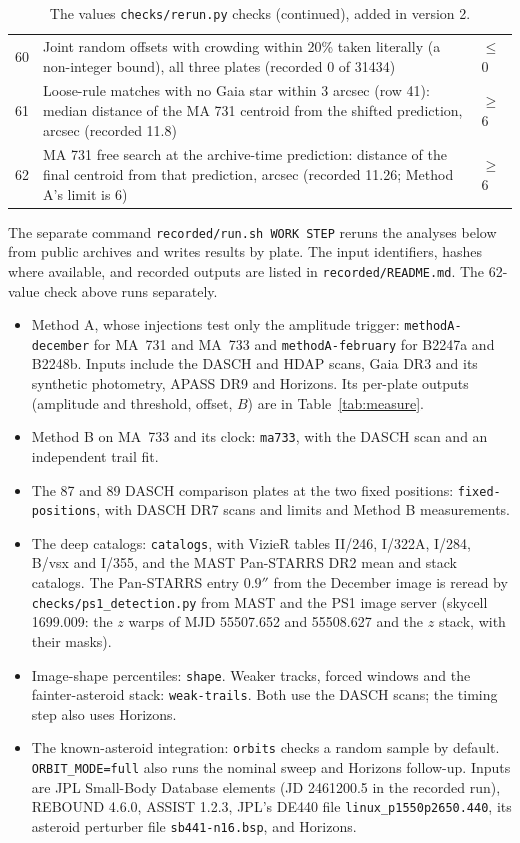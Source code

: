 \documentclass[11pt]{article}
\begin{document}
\begin{appendices}
\begin{table}[ht]
\begin{tabular}{@{}rp{}l@{}}
60 & Joint random offsets with crowding within 20\% taken literally (a non-integer bound), all three plates (recorded 0 of 31434) & $\le$ 0 \\
61 & Loose-rule matches with no Gaia star within 3 arcsec (row 41): median distance of the MA 731 centroid from the shifted prediction, arcsec (recorded 11.8) & $\ge$ 6 \\
62 & MA 731 free search at the archive-time prediction: distance of the final centroid from that prediction, arcsec (recorded 11.26; Method A's limit is 6) & $\ge$ 6 \\
\bottomrule
\end{tabular}
\caption{The values \texttt{checks/rerun.py} checks (continued), added in version 2.}
\label{tab:checks2}
\end{table}

The separate command \texttt{recorded/run.sh WORK STEP} reruns the analyses below from public archives and writes results by plate. The input identifiers, hashes where available, and recorded outputs are listed in \texttt{recorded/README.md}. The 62-value check above runs separately.
\begin{itemize}
\item Method A, whose injections test only the amplitude trigger: \texttt{methodA-december} for MA~731 and MA~733 and \texttt{methodA-february} for B2247a and B2248b. Inputs include the DASCH and HDAP scans, Gaia DR3 and its synthetic photometry, APASS DR9 and Horizons. Its per-plate outputs (amplitude and threshold, offset, $B$) are in Table~\ref{tab:measure}.
\item Method B on MA~733 and its clock: \texttt{ma733}, with the DASCH scan and an independent trail fit.
\item The 87 and 89 DASCH comparison plates at the two fixed positions: \texttt{fixed-positions}, with DASCH DR7 scans and limits and Method B measurements.
\item The deep catalogs: \texttt{catalogs}, with VizieR tables II/246, I/322A, I/284, B/vsx and I/355, and the MAST Pan-STARRS DR2 mean and stack catalogs. The Pan-STARRS entry $0.9''$ from the December image is reread by \texttt{checks/ps1\_detection.py} from MAST and the PS1 image server (skycell 1699.009: the $z$ warps of MJD 55507.652 and 55508.627 and the $z$ stack, with their masks).
\item Image-shape percentiles: \texttt{shape}. Weaker tracks, forced windows and the fainter-asteroid stack: \texttt{weak-trails}. Both use the DASCH scans; the timing step also uses Horizons.
\item The known-asteroid integration: \texttt{orbits} checks a random sample by default. \texttt{ORBIT\_MODE=full} also runs the nominal sweep and Horizons follow-up. Inputs are JPL Small-Body Database elements (JD 2461200.5 in the recorded run), REBOUND 4.6.0, ASSIST 1.2.3, JPL's DE440 file \texttt{linux\_p1550p2650.440}, its asteroid perturber file \texttt{sb441-n16.bsp}, and Horizons.
\end{itemize}

\end{appendices}
\end{document}
